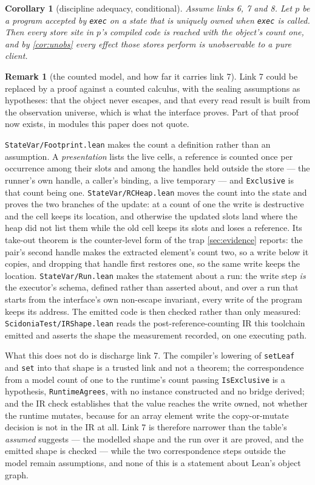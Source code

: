 \documentclass[11pt,a4paper]{article}
\theoremstyle{definition}
\newtheorem{remark}[definition]{Remark}
\theoremstyle{plain}
\newtheorem{corollary}[definition]{Corollary}
\newcommand{\code}[1]{\texttt{#1}}
\begin{document}
\begin{corollary}[discipline adequacy, conditional]\label{cor:adequacy}
Assume links 6, 7 and 8. Let $p$ be a program accepted by \code{exec} on a state
that is uniquely owned when \code{exec} is called. Then every store site in
$p$'s compiled code is reached with the object's count one, and by
\cref{cor:unobs} every effect those stores perform is unobservable to a pure
client.
\end{corollary}

\begin{remark}[the counted model, and how far it carries link 7]\label{rem:link7}
Link 7 could be replaced by a proof against a counted calculus, with the
sealing assumptions as hypotheses: that the object never escapes, and that every
read result is built from the observation universe, which is what the interface
proves. Part of that proof now exists, in modules this paper does not quote.

\code{StateVar/Footprint.lean} makes the count a definition rather than an
assumption. A \emph{presentation} lists the live cells, a reference is counted
once per occurrence among their slots and among the handles held outside the
store --- the runner's own handle, a caller's binding, a live temporary --- and
\code{Exclusive} is that count being one. \code{StateVar/RCHeap.lean} moves the
count into the state and proves the two branches of the update: at a count of one
the write is destructive and the cell keeps its location, and otherwise the
updated slots land where the heap did not list them while the old cell keeps its
slots and loses a reference. Its take-out theorem is the counter-level form of
the trap \cref{sec:evidence} reports: the pair's second handle makes the extracted
element's count two, so a write below it copies, and dropping that handle first
restores one, so the same write keeps the location. \code{StateVar/Run.lean} makes
the statement about a run: the write step \emph{is} the executor's schema, defined
rather than asserted about, and over a run that starts from the interface's own
non-escape invariant, every write of the program keeps its address. The emitted
code is then checked rather than only measured:
\code{ScidoniaTest/IRShape.lean} reads the post-reference-counting IR this
toolchain emitted and asserts the shape the measurement recorded, on one
executing path.

What this does not do is discharge link 7. The compiler's lowering of
\code{setLeaf} and \code{set} into that shape is a trusted link and not a theorem;
the correspondence from a model count of one to the runtime's count passing
\code{IsExclusive} is a hypothesis, \code{RuntimeAgrees}, with no instance
constructed and no bridge derived; and the IR check establishes that the value
reaches the write owned, not whether the runtime mutates, because for an array
element write the copy-or-mutate decision is not in the IR at all. Link 7 is
therefore narrower than the table's \emph{assumed} suggests --- the modelled shape
and the run over it are proved, and the emitted shape is checked --- while the two
correspondence steps outside the model remain assumptions, and none of this is a
statement about Lean's object graph.
\end{remark}
\end{document}
